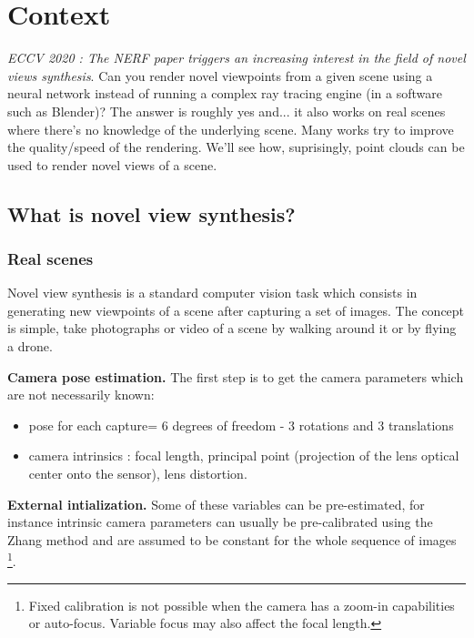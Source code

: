 \section{Context}
\label{sec:Context}

\textit{ECCV 2020 : The NERF \cite{mildenhall2020nerf} paper triggers an increasing interest in the field of novel views synthesis}. Can you render novel viewpoints from a given scene using a neural network instead of running a complex ray tracing engine (in a software such as Blender)? The answer is roughly yes and... it also works on real scenes where there's no knowledge of the underlying scene. Many works try to improve the quality/speed of the rendering. We'll see how, suprisingly, point clouds can be used to render novel views of a scene.


\subsection{What is novel view synthesis?}
\label{sec:novel_view_synthesis}


\subsubsection*{Real scenes}
\label{sec:real_scenes}
Novel view synthesis is a standard computer vision task which consists in generating new viewpoints of a scene after capturing a set of images.
The concept is simple, take photographs or video of a scene by walking around it or by flying a drone.

\noindent \textbf{Camera pose estimation.} The first step is to get the camera parameters which are not necessarily known: 

\begin{itemize}
    \item pose for each capture= 6 degrees of freedom - 3 rotations and 3 translations
    \item camera intrinsics : focal length, principal point (projection of the lens optical center onto the sensor), lens distortion.
\end{itemize}

\noindent \textbf{External intialization.} Some of these variables can be pre-estimated, for instance intrinsic camera parameters can usually be pre-calibrated using the Zhang method \cite{Zhang00calib} and are assumed to be constant for the whole sequence of images \footnote{Fixed calibration is not possible when the camera has a zoom-in capabilities or auto-focus. Variable focus may also affect the focal length.}.

